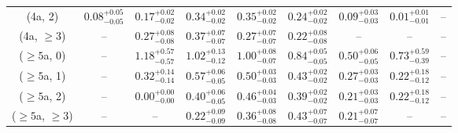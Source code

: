 \begin{table}[h!]
{\begin{tabular}{ccccccccc}
	(4a, 2) & $0.08^{+ 0.05 }_{- 0.05 }$ & $0.17^{+ 0.02 }_{- 0.02 }$ & $0.34^{+ 0.02 }_{- 0.02 }$ & $0.35^{+ 0.02 }_{- 0.02 }$ & $0.24^{+ 0.02 }_{- 0.02 }$ & $0.09^{+ 0.03 }_{- 0.03 }$ & $0.01^{+ 0.01 }_{- 0.01 }$ & -- \\[0.5ex] 
	(4a, $\ge3$) & -- & $0.27^{+ 0.08 }_{- 0.08 }$ & $0.37^{+ 0.07 }_{- 0.07 }$ & $0.27^{+ 0.07 }_{- 0.07 }$ & $0.22^{+ 0.08 }_{- 0.08 }$ & -- & -- & -- \\[0.5ex] 
	($\ge5$a, 0) & -- & $1.18^{+ 0.57 }_{- 0.57 }$ & $1.02^{+ 0.13 }_{- 0.12 }$ & $1.00^{+ 0.08 }_{- 0.07 }$ & $0.84^{+ 0.05 }_{- 0.05 }$ & $0.50^{+ 0.06 }_{- 0.05 }$ & $0.73^{+ 0.59 }_{- 0.39 }$ & -- \\[0.5ex] 
	($\ge5$a, 1) & -- & $0.32^{+ 0.14 }_{- 0.14 }$ & $0.57^{+ 0.06 }_{- 0.05 }$ & $0.50^{+ 0.03 }_{- 0.03 }$ & $0.43^{+ 0.02 }_{- 0.02 }$ & $0.27^{+ 0.03 }_{- 0.03 }$ & $0.22^{+ 0.18 }_{- 0.12 }$ & -- \\[0.5ex] 
	($\ge5$a, 2) & -- & $0.00^{+ 0.00 }_{- 0.00 }$ & $0.40^{+ 0.06 }_{- 0.05 }$ & $0.46^{+ 0.04 }_{- 0.03 }$ & $0.39^{+ 0.02 }_{- 0.02 }$ & $0.21^{+ 0.03 }_{- 0.03 }$ & $0.22^{+ 0.18 }_{- 0.12 }$ & -- \\[0.5ex] 
	($\ge5$a, $\ge3$) & -- & -- & $0.22^{+ 0.09 }_{- 0.09 }$ & $0.36^{+ 0.08 }_{- 0.08 }$ & $0.43^{+ 0.07 }_{- 0.07 }$ & $0.21^{+ 0.07 }_{- 0.07 }$ & -- & -- \\[0.5ex] 
	\hline
	\hline
\end{tabular}}
\end{table}
